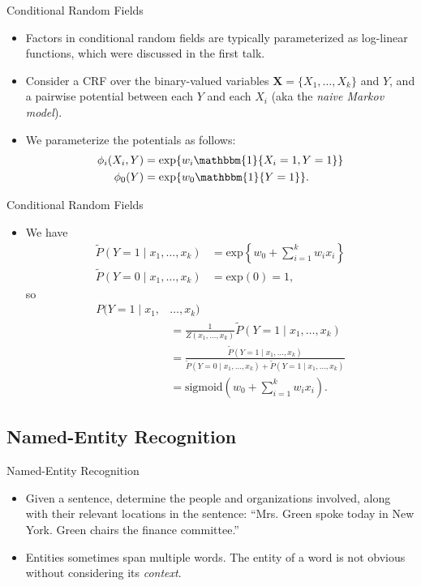 \documentclass[11pt]{beamer}
\begin{document}
\begin{frame}{Conditional Random Fields}
\begin{itemize}
	\item Factors in conditional random fields are typically parameterized
	as log-linear functions, which were discussed in the first talk.
	\item Consider a CRF over the binary-valued variables $\boldsymbol{X} =
	\{ X_{1}, \ldots, X_{k} \}$ and $Y$, and a pairwise potential between
	each $Y$ and each $X_{i}$ (aka the \emph{naive Markov model}).
	\item We parameterize the potentials as follows:
	\begin{align*}
		\phi_{i}(X_{i},Y) &= \text{exp}\{w_{i}\mathbbm{1}
		\{X_{i} = 1, Y = 1\}\} \\
		\phi_{0}(Y) &= \text{exp}\{w_{0}\mathbbm{1}\{Y=1\}\}.
	\end{align*}
\end{itemize}
\end{frame}

\begin{frame}{Conditional Random Fields}
\begin{itemize}
	\item We have
	\begin{align*}
		\tilde{P}(Y = 1 \;|\; x_{1}, \ldots, x_{k}) &= \text{exp}\left\{
		w_{0} + \sum_{i=1}^{k} w_{i}x_{i}\right\}\\
		\tilde{P}(Y = 0 \;|\; x_{1}, \ldots, x_{k}) &= \text{exp}(0) =
		1,
	\end{align*}
	so
	\begin{align*}
		P(Y = 1 \;|\; x_{1}, &\ldots, x_{k})\\ &= \frac{1}{Z(x_{1}, \ldots,
		x_{k})} \tilde{P}(Y = 1 \;|\; x_{1}, \ldots, x_{k})\\
		&= \frac{\tilde{P}(Y = 1 \;|\; x_{1}, \ldots, x_{k})}
		{\tilde{P}(Y = 0 \;|\; x_{1}, \ldots, x_{k}) +
		\tilde{P}(Y = 1 \;|\; x_{1}, \ldots, x_{k})}\\
		&= \text{sigmoid}\left(w_{0} + \sum_{i=1}^{k} w_{i}x_{i}\right).
	\end{align*}
\end{itemize}
\end{frame}

\subsection{Named-Entity Recognition}

\begin{frame}{Named-Entity Recognition \cite{pgmslides}}
\begin{itemize}
	\item Given a sentence, determine the people and organizations involved,
	along with their relevant locations in the sentence: ``Mrs. Green spoke
	today in New York. Green chairs the finance committee.''
	\item Entities sometimes span multiple words. The entity of a word is
	not obvious without considering its \emph{context}.
\end{itemize}
\end{frame}
\end{document}
